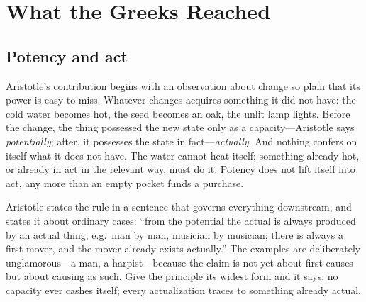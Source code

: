 \section{What the Greeks Reached}

\subsection{Potency and act}

Aristotle's contribution begins with an observation about change so plain that its power is easy to miss. Whatever changes acquires something it did not have: the cold water becomes hot, the seed becomes an oak, the unlit lamp lights. Before the change, the thing possessed the new state only as a capacity---Aristotle says \emph{potentially}; after, it possesses the state in fact---\emph{actually}. And nothing confers on itself what it does not have. The water cannot heat itself; something already hot, or already in act in the relevant way, must do it. Potency does not lift itself into act, any more than an empty pocket funds a purchase.

Aristotle states the rule in a sentence that governs everything downstream, and states it about ordinary cases: ``from the potential the actual is always produced by an actual thing, e.g.\ man by man, musician by musician; there is always a first mover, and the mover already exists actually.'' The examples are deliberately unglamorous---a man, a harpist---because the claim is not yet about first causes but about causing as such. Give the principle its widest form and it says: no capacity ever cashes itself; every actualization traces to something already actual.

